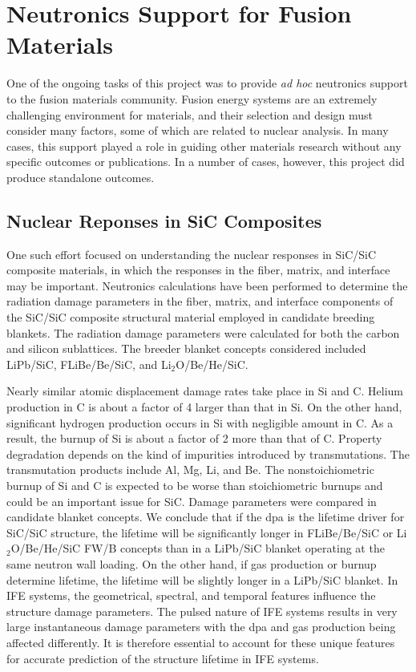 \chapter{Neutronics Support for Fusion Materials}

One of the ongoing tasks of this project was to provide \emph{ad hoc}
neutronics support to the fusion materials community.  Fusion energy systems
are an extremely challenging environment for materials, and their selection
and design must consider many factors, some of which are related to nuclear
analysis.  In many cases, this support played a role in guiding other
materials research without any specific outcomes or publications.  In a number
of cases, however, this project did produce standalone outcomes.

\section{Nuclear Reponses in SiC Composites}

One such effort focused on understanding the nuclear responses in SiC/SiC
composite materials, in which the responses in the fiber, matrix, and
interface may be important.  Neutronics calculations have been performed to
determine the radiation damage parameters in the fiber, matrix, and interface
components of the SiC/SiC composite structural material employed in candidate
breeding blankets. The radiation damage parameters were calculated for both
the carbon and silicon sublattices. The breeder blanket concepts considered
included LiPb/SiC, FLiBe/Be/SiC, and Li$_2$O/Be/He/SiC.

Nearly similar atomic displacement damage rates take place in Si and C. Helium
production in C is about a factor of 4 larger than that in Si. On the other
hand, significant hydrogen production occurs in Si with negligible amount in
C. As a result, the burnup of Si is about a factor of 2 more than that of
C. Property degradation depends on the kind of impurities introduced by
transmutations. The transmutation products include Al, Mg, Li, and Be. The
nonstoichiometric burnup of Si and C is expected to be worse than
stoichiometric burnups and could be an important issue for SiC. Damage
parameters were compared in candidate blanket concepts. We conclude that if
the dpa is the lifetime driver for SiC/SiC structure, the lifetime will be
significantly longer in FLiBe/Be/SiC or Li$_2$O/Be/He/SiC \gls{FW/B} concepts
than in a LiPb/SiC blanket operating at the same neutron wall loading. On the
other hand, if gas production or burnup determine lifetime, the lifetime will
be slightly longer in a LiPb/SiC blanket.  In \gls{IFE} systems, the geometrical,
spectral, and temporal features influence the structure damage parameters. The
pulsed nature of \gls{IFE} systems results in very large instantaneous damage
parameters with the dpa and gas production being affected differently. It is
therefore essential to account for these unique features for accurate
prediction of the structure lifetime in \gls{IFE} systems.

